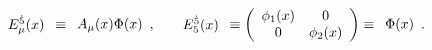 \begin{equation} \label{VIEL-INV}
\begin{array}{c}
    E^{{\dot5}}_\mu(x)
    \end{array} \equiv
\begin{array}{c}
    A_\mu(x) \Phi(x)
    \end{array} , \hspace{.5cm}
\begin{array}{c}
    E_{5}^{\dot 5}(x)
    \end{array} \equiv
\left(\begin{array}{cc}
    \phi_1(x) &  0 \\
    0     & \phi_2(x)
    \end{array}\right) \equiv
\begin{array}{c}
    \Phi(x)
    \end{array}.
\end{equation}

